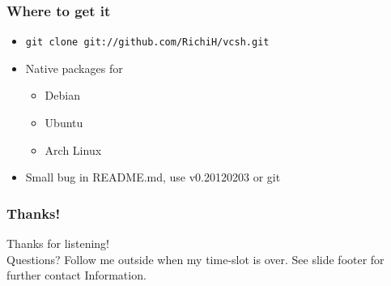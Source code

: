 \documentclass[t]{beamer}
\begin{document}
\begin{frame}
	\frametitle{Where to get it}
	\begin{itemize}
		\item \texttt{git clone git://github.com/RichiH/vcsh.git}
		\item Native packages for
		\begin{itemize}
			\item Debian
			\item Ubuntu
			\item Arch Linux
		\end{itemize}
		\item Small bug in README.md, use v0.20120203 or git
	\end{itemize}
\end{frame}

\begin{frame}
	\frametitle{Thanks!}
		\begin{center}
			\vfill
			Thanks for listening!\\
			\vfill
			Questions? Follow me outside when my time-slot is over.
			\vfill
			See slide footer for further contact Information.
			\vfill
		\end{center}
\end{frame}
\end{document}
